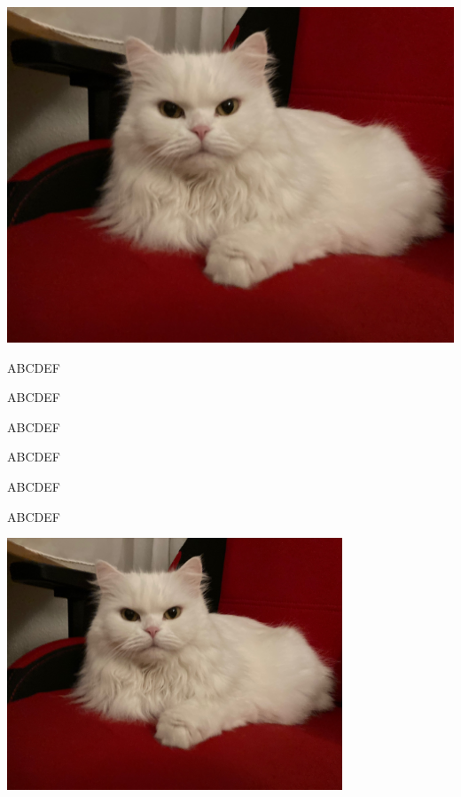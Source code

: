 \documentclass[12pt,ngerman,parskip=half]{scrreprt} %
\begin{document}
\includegraphics[height=\textheight,width=\textwidth]{Katze2.jpg}

ABC\hspace{10mm}DEF

ABC\hspace{1cm}DEF

ABC\hspace{10pt}DEF

ABC\hspace{10pc}DEF

ABC\hspace{10ex}DEF

ABC\hspace{10em}DEF



\begin{center}
\includegraphics[width=0.75\textwidth]{./Bilder/Katze/Katze2.jpg}
\end{center}
\end{document}

